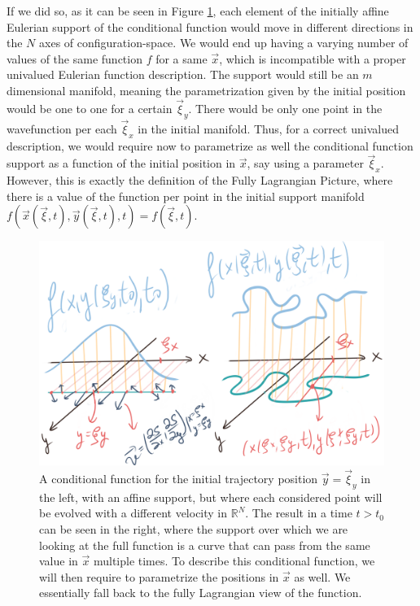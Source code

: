 \documentclass[11pt, a4paper]{article} %
\newcommand{\R}{\mathbb{R}} %
\begin{document}
{If we did so, as it can be seen in Figure \ref{fig:fallback}, each element of the initially affine Eulerian support of the conditional function would move in different directions in the $N$ axes of configuration-space. We would end up having a varying number of values of the same function $f$ for a same $\vec{x}$, which is incompatible with a proper univalued Eulerian function description. The support would still be an $m$ dimensional manifold, meaning the parametrization given by the initial position would be one to one for a certain $\vec{\xi}_y$. There would be only one point in the wavefunction per each $\vec{\xi}_x$ in the initial manifold. Thus, for a correct univalued description, we would require now to parametrize as well the conditional function support as a function of the initial position in $\vec{x}$, say using a parameter $\vec{\xi}_x$. However, this is exactly the definition of the Fully Lagrangian Picture, where there is a value of the function per point in the initial support manifold $f(\vec{x}(\vec{\xi},t), \vec{y}(\vec{\xi},t),t)=f(\vec{\xi},t)$.
}


\begin{figure}[h!]
  \centering
    \includegraphics[width=0.65\linewidth]{unstructuring.png}
  \caption{A conditional function for the initial trajectory position $\vec{y}=\vec{\xi}_y$ in the left, with an affine support, but where each considered point will be evolved with a different velocity in $\R^N$. The result in a time $t>t_0$ can be seen in the right, where the support over which we are looking at the full function is a curve that can pass from the same value in $\vec{x}$ multiple times. To describe this conditional function, we will then require to parametrize the positions in $\vec{x}$ as well. We essentially fall back to the fully Lagrangian view of the function. }
  \label{fig:fallback}
\end{figure}
\end{document}
